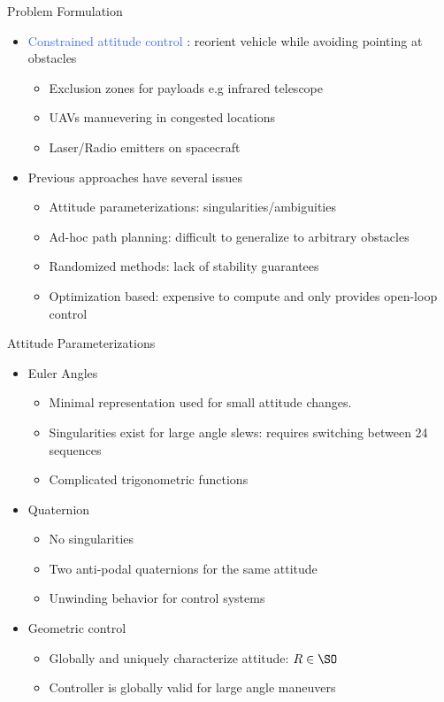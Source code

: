 \documentclass[11pt,professionalfonts]{beamer}
\newcommand{\vs}{\vspace{0.3cm}}
\def\Emph{\textcolor{RoyalBlue}}
\begin{document}
\begin{frame}[t]{Problem Formulation} %
\begin{itemize}
	\item \Emph{Constrained attitude control} : reorient vehicle while avoiding pointing at obstacles
	\begin{itemize}
		\item Exclusion zones for payloads e.g infrared telescope
		\item UAVs manuevering in congested locations
		\item Laser/Radio emitters on spacecraft
	\end{itemize}
	\pause
	\vs
	\item Previous approaches have several issues
	\begin{itemize}
		\item Attitude parameterizations: singularities/ambiguities
		\item Ad-hoc path planning: difficult to generalize to arbitrary obstacles
		\item Randomized methods: lack of stability guarantees
		\item Optimization based: expensive to compute and only provides open-loop control  
	\end{itemize}
\end{itemize}
\end{frame} %

\begin{frame}{Attitude Parameterizations}
	\begin{itemize}
		\item Euler Angles
		\begin{itemize}
			\item Minimal representation used for small attitude changes.
			\item Singularities exist for large angle slews: requires switching between 24 sequences
			\item Complicated trigonometric functions
		\end{itemize}
		\pause
		\vs
		\item Quaternion 
		\begin{itemize}
			\item No singularities
			\item Two anti-podal quaternions for the same attitude
			\item Unwinding behavior for control systems
		\end{itemize}
		\pause
		\vs
		\item Geometric control
		\begin{itemize}
			\item Globally and uniquely characterize attitude: \( R \in \SO \)
			\item Controller is globally valid for large angle maneuvers
		\end{itemize}
	\end{itemize}
	
\end{frame}
\end{document}
